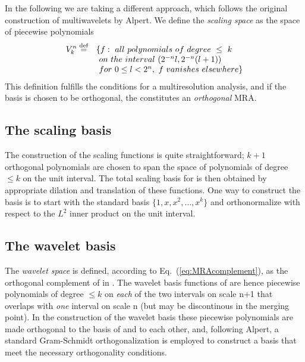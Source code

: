 In the following we are taking a different approach, which follows the original 
construction of multiwavelets by Alpert\cite{Alpert93}. We define the \emph{scaling 
space}  as the space of piecewise polynomials
\begin{equation}
    \begin{array}{rl}
        \displaystyle \scalingspace{n} \mydef & \lbrace f:\ all\ polynomials\ of\ degree\ \leq\ k\\ 
	\displaystyle &\ on\ the\ interval\ (2^{-n}l,2^{-n}(l+1))\\
	\displaystyle &\ for\ 0 \leq l < 2^n,\ f\ vanishes\ elsewhere \rbrace
    \end{array}
\end{equation}
This definition fulfills the conditions for a multiresolution analysis, and if the 
basis is chosen to be orthogonal, the  constitutes an \emph{orthogonal} MRA.

\subsection{The scaling basis}
The construction of the scaling functions is quite straightforward; $k+1$ orthogonal 
polynomials are chosen to span the space of polynomials of degree $\leq k$ on the unit 
interval. The total scaling basis for  is then obtained by appropriate dilation 
and translation of these functions. One way to construct the basis is to start with the 
standard basis $\lbrace 1,x,x^2,\dots,x^k\rbrace$ and orthonormalize with respect to 
the $L^2$ inner product on the unit interval.

\subsection{The wavelet basis}
The \emph{wavelet space}  is defined, according to Eq.~(\ref{eq:MRAcomplement}), 
as the orthogonal complement of  in . The wavelet basis functions 
of  are hence piecewise polynomials of degree $\leq k$ on \emph{each} of the two 
intervals on scale n+1 that overlaps with \emph{one} interval on scale n (but may be 
discontinous in the merging point). In the construction of the wavelet basis these 
piecewise polynomials are made orthogonal to the basis of  and to each other, 
and, following Alpert\cite{Alpert93}, a standard Gram-Schmidt orthogonalization is 
employed to construct a basis that meet the necessary orthogonality conditions.

